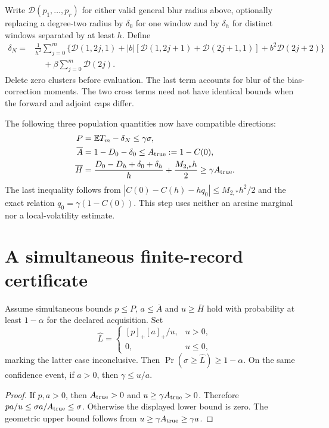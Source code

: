 Write $\mathcal D(p_1,\ldots,p_r)$ for either valid general blur radius
above, optionally replacing a degree-two radius by $\delta_0$ for one window
and by $\delta_h$ for distinct windows separated by at least $h$.  Define
\begin{align}
 \delta_N={}&\frac1{h^2}\sum_{j=0}^m
 \bigl\{\mathcal D(1,2j,1)
 +|b|[\mathcal D(1,2j+1)+\mathcal D(2j+1,1)]
 +b^2\mathcal D(2j+2)\bigr\}\\
 &\quad+\beta\sum_{j=0}^m\mathcal D(2j).
 \label{eq:dc-score-blur}
\end{align}
Delete zero clusters before evaluation.  The last term accounts for blur of
the bias-correction moments.  The two cross terms need not have identical
bounds when the forward and adjoint caps differ.

The following three population quantities now have compatible directions:
\begin{align}
 P&=\mathbb ET_m-\delta_N\le\gamma\sigma,\\
 \overline A&=1-D_0-\delta_0\le A_{\rm true}:=1-C(0),\\
 \overline H&=\frac{D_0-D_h+\delta_0+\delta_h}{h}
                     +\frac{M_{2,*}h}{2}
                 \ge\gamma A_{\rm true}.
 \label{eq:dc-three-population}
\end{align}
The last inequality follows from
$|C(0)-C(h)-hq_0|\le M_{2,*}h^2/2$ and the exact relation
$q_0=\gamma(1-C(0))$.  This step uses neither an arcsine marginal nor a
local-volatility estimate.

\section{A simultaneous finite-record certificate}

\begin{theorem}
Assume simultaneous bounds $p\le P$, $a\le\overline A$ and
$u\ge\overline H$ hold with probability at least $1-\alpha$ for the
declared acquisition.  Set
\begin{equation}
 \widehat L=
 \begin{cases}
 [p]_+[a]_+/u,&u>0,\\
 0,&u\le0,
 \end{cases}
 \label{eq:dc-certificate}
\end{equation}
marking the latter case inconclusive.  Then
$\Pr(\sigma\ge\widehat L)\ge1-\alpha$.  On the same confidence event, if
$a>0$, then $\gamma\le u/a$.
\end{theorem}
\begin{proof}
If $p,a>0$, then $A_{\rm true}>0$ and
$u\ge\gamma A_{\rm true}>0$.  Therefore
$pa/u\le\sigma a/A_{\rm true}\le\sigma$.  Otherwise the displayed lower
bound is zero.  The geometric upper bound follows from
$u\ge\gamma A_{\rm true}\ge\gamma a$.
\end{proof}

